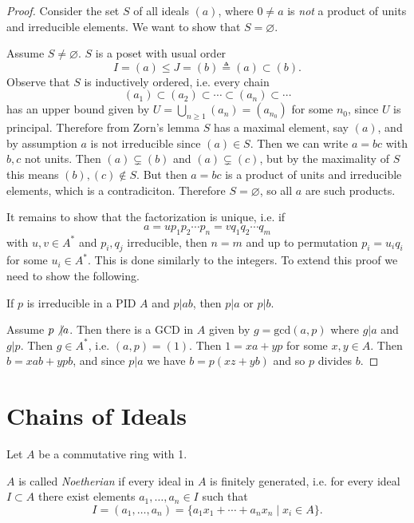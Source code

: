 \begin{proof}
Consider the set $S$ of all ideals $(a)$, where $0 \neq a$ is \emph{not} a
product of units and irreducible elements. We want to show that $S =
\varnothing$.

Assume $S \neq \varnothing$. $S$ is a poset with usual order
$$
I = (a) \leq J = (b) \triangleq (a) \subset (b).
$$
Observe that $S$ is inductively ordered, i.e. every chain
$$
(a_1) \subset (a_2) \subset \cdots \subset (a_n) \subset \cdots
$$
has an upper bound given by $U = \bigcup_{n \geq 1} (a_n) = (a_{n_0})$ for
some $n_0$, since $U$ is principal. Therefore from Zorn's lemma $S$ has a maximal
element, say $(a)$, and by assumption $a$ is not irreducible since
$(a) \in S$. Then we can write $a = bc$ with $b, c$ not units. Then
$(a) \subsetneq (b)$ and $(a) \subsetneq (c)$, but by the maximality
of $S$ this means $(b), (c) \notin S$. But then $a = bc$ is a product
of units and irreducible elements, which is a contradiciton. Therefore
$S = \varnothing$, so all $a$ are such products.

It remains to show that the factorization is unique, i.e. if
$$
a = u p_1 p_2 \cdots p_n = v q_1 q_2 \cdots q_m
$$
with $u, v \in A^\ast$ and $p_i, q_j$ irreducible, then $n = m$ and up
to permutation $p_i = u_i q_i$ for some $u_i \in A^\ast$. This is done
similarly to the integers. To extend this proof we need to show the
following.

\begin{lemma}
If $p$ is irreducible in a PID $A$ and $p \vert ab$, then $p \vert a$ or $p
\vert b$.
\end{lemma}

Assume $p \not\vert a$. Then there is a GCD in $A$ given by
$g = \mathrm{gcd}(a, p)$ where $g \vert a$ and $g \vert p$. Then
$g \in A^\ast$, i.e. $(a, p) = (1)$. Then $1 = xa + yp$ for some $x, y
\in A$. Then $b = xab + ypb$, and since $p \vert a$ we have
$b = p(xz + yb)$ and so $p$ divides $b$.
\end{proof}

\section{Chains of Ideals}
Let $A$ be a commutative ring with 1.
\begin{defn}
$A$ is called \emph{Noetherian} if every ideal in $A$ is finitely
generated, i.e. for every ideal $I \subset A$ there exist elements
$a_1, \dots, a_n \in I$ such that
$$
  I
= (a_1, \dots, a_n)
= \{ a_1 x_1 + \cdots + a_n x_n \mid x_i \in A \}.
$$
\end{defn}

